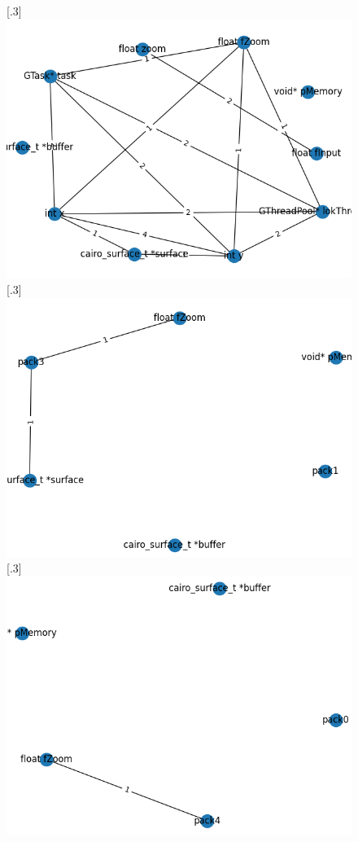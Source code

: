 \documentclass{article}
\begin{document}
\begin{figure}[ht]
    [.3\linewidth]{%
        \includegraphics[width=\linewidth]{tilebuffer_original.png}%
      }
    \hfill
    [.3\linewidth]{%
        \includegraphics[width=\linewidth]{libreoffice_a.png}%
      }%
      \hfill
      [.3\linewidth]{%
        \includegraphics[width=\linewidth]{libreoffice_p.png}%
}
\end{figure}
\end{document}
